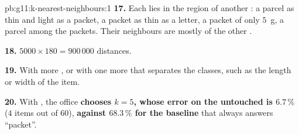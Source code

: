 \begin{solution}{pb:g11:k-nearest-neighbours:1}
\textbf{17.} Each lies in the region of another : a parcel as thin and light as a packet, a packet as thin as a
letter, a packet of only $5$~g, a parcel among the packets. Their neighbours are mostly of the other .

\textbf{18.} $5000 \times 180 = 900\,000$ distances.

\textbf{19.} With more , or with one more  that separates the classes, such as the length or
width of the item.

\textbf{20.} With , the office \textbf{chooses $k = 5$, whose error on the untouched  is $6.7\,\%$}
($4$ items out of $60$), \textbf{against $68.3\,\%$ for the baseline} that always answers ``packet''.
\end{solution}
